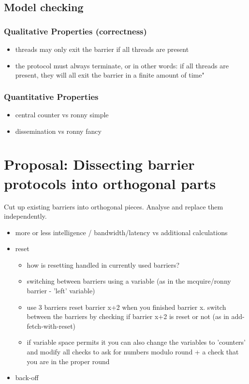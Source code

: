 \documentclass[a4paper, 10pt]{article}
\begin{document}
\subsection{Model checking}
\subsubsection{Qualitative Properties (correctness)}
\begin{itemize}
	\item threads may only exit the barrier if all threads are present
	\item the protocol must always terminate, or in other words: if all threads are present, they will all exit the barrier in a finite amount of time"
\end{itemize}
\subsubsection{Quantitative Properties}
\begin{itemize}
	\item central counter vs ronny simple
	\item dissemination vs ronny fancy
\end{itemize}

\section{Proposal: Dissecting barrier protocols into orthogonal parts}
Cut up existing barriers into orthogonal pieces. Analyse and replace them independently.
\begin{itemize}
	\item more or less intelligence / bandwidth/latency vs additional calculations
	\item 
		reset

		\begin{itemize}
			\item how is resetting handled in currently used barriers?
			\item switching between barriers using a variable (as in the mcquire/ronny barrier - 'left' variable)
			\item use 3 barriers reset barrier x+2 when you finished barrier x. switch between the barriers by checking if barrier x+2 is reset or not (as in add-fetch-with-reset)
			\item if variable space permits it you can also change the variables to 'counters' and modify all checks to ask for numbers modulo round + a check that you are in the proper round
		\end{itemize}

	\item back-off
\end{itemize}
\end{document}
